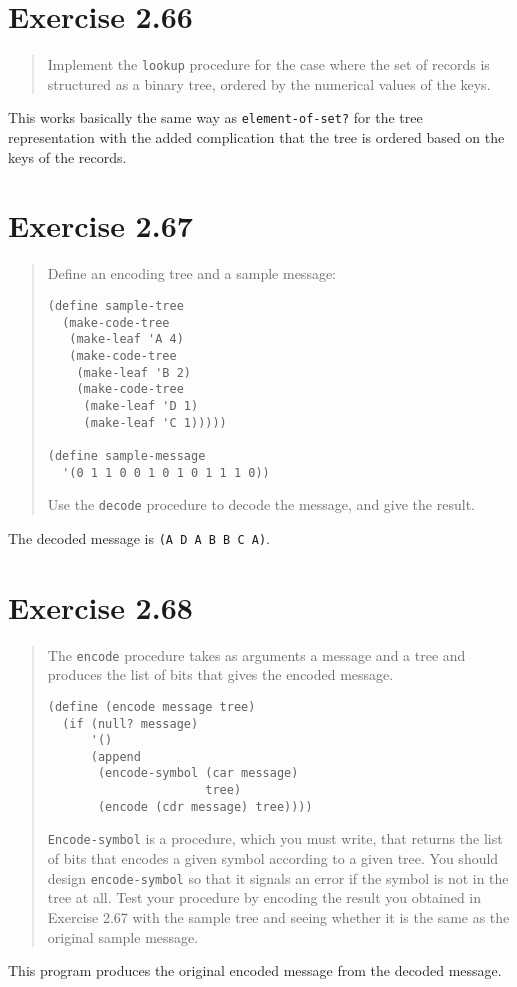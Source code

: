 \documentclass{article}
\begin{document}




\section{Exercise 2.66}
\begin{quote}
    Implement the \texttt{lookup} procedure for the case where the set of
    records is structured as a binary tree, ordered by the numerical values of
    the keys.
\end{quote}

This works basically the same way as \texttt{element-of-set?} for the tree
representation with the added complication that the tree is ordered based on
the keys of the records.



\section{Exercise 2.67}
\begin{quote}
    Define an encoding tree and a sample message:

    \begin{lstlisting}
(define sample-tree
  (make-code-tree
   (make-leaf 'A 4)
   (make-code-tree
    (make-leaf 'B 2)
    (make-code-tree
     (make-leaf 'D 1)
     (make-leaf 'C 1)))))

(define sample-message
  '(0 1 1 0 0 1 0 1 0 1 1 1 0))
    \end{lstlisting}

    Use the \texttt{decode} procedure to decode the message, and give the
    result.
\end{quote}

The decoded message is \texttt{(A D A B B C A)}.

\section{Exercise 2.68}
\begin{quote}
    The \texttt{encode} procedure takes as arguments a message and a tree and
    produces the list of bits that gives the encoded message.

    \begin{lstlisting}
(define (encode message tree)
  (if (null? message)
      '()
      (append
       (encode-symbol (car message)
                      tree)
       (encode (cdr message) tree))))
    \end{lstlisting}

    \texttt{Encode-symbol} is a procedure, which you must write, that returns
    the list of bits that encodes a given symbol according to a given tree. You
    should design \texttt{encode-symbol} so that it signals an error if the
    symbol is not in the tree at all. Test your procedure by encoding the
    result you obtained in Exercise 2.67 with the sample tree and seeing
    whether it is the same as the original sample message.
\end{quote}



This program produces the original encoded message from the decoded message.
\end{document}
